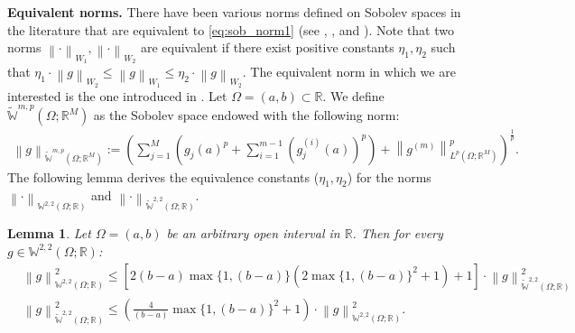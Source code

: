 \documentclass{article}
\newtheorem{lemma}{Lemma}
\newcommand{\norm}[1]{\left\lVert#1\right\rVert}
\newcommand{\lpm}[1]{{L}^{#1}\left(\Omega; \mathbb{R}^M\right)}
\newcommand{\smpeq}{\widetilde{\mathbb{W}}^{m,p}\left(\Omega; \mathbb{R}^M\right)}
\newcommand{\sob}[2]{\mathbb{W}^{#1,#2}\left(\Omega; \mathbb{R}\right)}
\newcommand{\sobeq}[2]{\widetilde{\mathbb{W}}^{#1,#2}\left(\Omega; \mathbb{R}\right)}
\begin{document}
{\bf Equivalent norms.} There have been various norms defined on Sobolev spaces in the literature that are equivalent to  \eqref{eq:sob_norm1} (see \citep{adams2003sobolev}, \citep[Ch. 7]{berlinet2011reproducing}, and \citep[Sec. 10.2]{wahba1990spline}). Note that two norms $\norm{\cdot}_{W_1}, \norm{\cdot}_{W_2}$ are equivalent if there exist positive constants $\eta_1, \eta_2$ such that
$
\eta_1\cdot\norm{g}_{W_2} \leqslant \norm{g}_{W_1} \leqslant \eta_2\cdot\norm{g}_{W_2}
$. The equivalent norm in which we are interested is the one introduced in \citep{kimeldorf1971some}. Let $\Omega = (a,b) \subset \mathbb{R}$. We define $\smpeq$ as the Sobolev space endowed with the following norm:
\begin{align}\label{eq:sob_norm_eq}
    \norm{g}_{\smpeq} := \left(\sum^M_{j=1} \left(g_j(a)^p +\sum^{m-1}_{i=1} \left(g_j^{(i)}(a)\right)^p \right) + \norm{g^{(m)}}_{\lpm{p}}^p \right)^\frac{1}{p}.
\end{align}
The following lemma derives the equivalence  constants ($\eta_1,\eta_2$) for the norms $\norm{\cdot}_{\sob{2}{2}}$ and $\norm{\cdot}_{\sobeq{2}{2}}$.
\begin{lemma}\label{lem:norm-equiv}
    Let $\Omega = (a,b)$ be an arbitrary open interval in $\mathbb{R}$. Then for every $g \in \sob{2}{2}$:
    \begin{align}
        \label{lem:norm-equiv1}
        &\norm{g}^2_{\sob{2}{2}}\leqslant \left[2(b-a)\max\{1, (b-a)\} \left (2\max\{1, (b-a)\}^2 + 1 \right) +1\right] \cdot\norm{g}^2_{\sobeq{2}{2}} \\ \label{lem:norm-equiv2}
        &\norm{g}^2_{\sobeq{2}{2}}\leqslant \left(\frac{4}{(b-a)}\max\{1, (b-a)\}^2 + 1\right)\cdot \norm{g}^2_{\sob{2}{2}}.
    \end{align}
\end{lemma}
\end{document}
